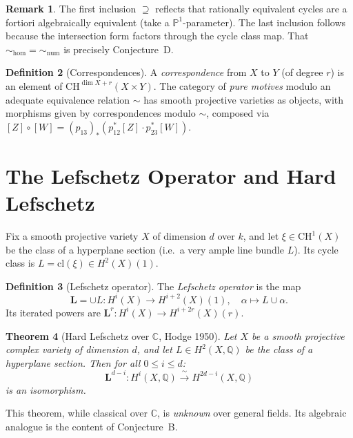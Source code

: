 \documentclass[12pt,a4paper]{amsart}
\newtheorem{theorem}{Theorem}[section]
\theoremstyle{definition}
\newtheorem{definition}[theorem]{Definition}
\newtheorem{remark}[theorem]{Remark}
\newcommand{\Q}{\mathbb{Q}}
\newcommand{\C}{\mathbb{C}}
\newcommand{\PP}{\mathbb{P}}
\newcommand{\CH}{\mathrm{CH}}
\newcommand{\cl}{\mathrm{cl}}
\begin{document}
\begin{remark}
The first inclusion $\supseteq$ reflects that rationally equivalent cycles
are a fortiori algebraically equivalent (take a $\PP^1$-parameter).
The last inclusion follows because the intersection form factors through the
cycle class map.  That ${\sim_{\mathrm{hom}}} = {\sim_{\mathrm{num}}}$
is precisely Conjecture~D.
\end{remark}

\begin{definition}[Correspondences]
A \emph{correspondence} from $X$ to $Y$ (of degree $r$) is an element of
$\CH^{\dim X + r}(X \times Y)$.  The category of \emph{pure motives} modulo
an adequate equivalence relation $\sim$ has smooth projective varieties as
objects, with morphisms given by correspondences modulo $\sim$, composed via
$[Z] \circ [W] = (p_{13})_* (p_{12}^* [Z] \cdot p_{23}^* [W])$.
\end{definition}

\section{The Lefschetz Operator and Hard Lefschetz}\label{sec:lefschetz}

Fix a smooth projective variety $X$ of dimension $d$ over $k$, and let
$\xi \in \CH^1(X)$ be the class of a hyperplane section (i.e.\ a very ample
line bundle $L$).  Its cycle class is $L = \cl(\xi) \in H^2(X)(1)$.

\begin{definition}[Lefschetz operator]
The \emph{Lefschetz operator} is the map
\[
  \mathbf{L} = \cup L : H^i(X) \longrightarrow H^{i+2}(X)(1),
  \quad
  \alpha \mapsto L \cup \alpha.
\]
Its iterated powers are $\mathbf{L}^r : H^i(X) \to H^{i+2r}(X)(r)$.
\end{definition}

\begin{theorem}[Hard Lefschetz over $\mathbb{C}$, Hodge 1950]\label{thm:HL}
Let $X$ be a smooth projective complex variety of dimension $d$, and let
$L \in H^2(X,\Q)$ be the class of a hyperplane section.  Then for all
$0 \leq i \leq d$:
\[
  \mathbf{L}^{d-i} : H^i(X,\Q) \xrightarrow{\;\sim\;} H^{2d-i}(X,\Q)
\]
is an isomorphism.
\end{theorem}

This theorem, while classical over $\C$, is \emph{unknown} over general
fields.  Its algebraic analogue is the content of Conjecture~B.
\end{document}
